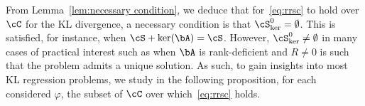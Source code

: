 \documentclass[11pt]{amsart}
\newcommand{\es}[1]{{\color{blue}#1}}
\newcommand{\esb}[2]{{\color{blue}\sout{#1}#2}}
\begin{document}
From Lemma~\ref{lem:necessary condition}, we deduce that for~\eqref{eq:rrsc} to hold over $\cC$ for the KL divergence, a necessary condition is that $\cS_{\ker}^{0} = \emptyset$. This is satisfied, for instance, when $\cS + \ker(\bA) = \cS$. However, $\cS_{\ker}^{0} \neq \emptyset$ in many cases of practical interest such as when $\bA$ is rank-deficient and $R \neq 0$ is such that the problem admits a unique solution. As such, to gain insights into most KL regression problems, we study in the following proposition, for each considered $\varphi$, the subset of $\cC$ over which~\eqref{eq:rrsc} holds.

\end{document}
